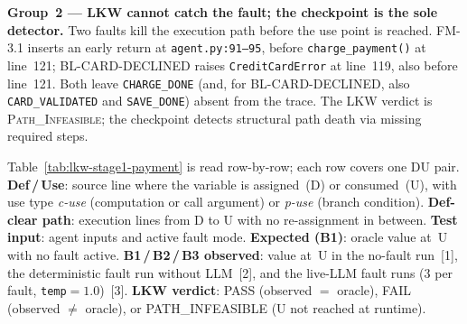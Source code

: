 \documentclass[sigconf,review,anonymous,balance=false]{acmart}
\begin{document}
\textbf{Group~2 --- LKW cannot catch the fault; the checkpoint is the sole detector.}
Two faults kill the execution path before the use point is reached.
FM-3.1 inserts an early return at \texttt{agent.py:91--95}, before
\texttt{charge\_payment()} at line~121; BL-CARD-DECLINED raises
\texttt{CreditCardError} at line~119, also before line~121.
Both leave \texttt{CHARGE\_DONE} (and, for BL-CARD-DECLINED, also
\texttt{CARD\_VALIDATED} and \texttt{SAVE\_DONE}) absent from the trace.
The LKW verdict is \textsc{Path\_Infeasible}; the checkpoint detects structural
path death via missing required steps.

Table~\ref{tab:lkw-stage1-payment} is read row-by-row; each row covers one DU pair.
\textbf{Def\,/\,Use}: source line where the variable is assigned~(D) or
consumed~(U), with use type \emph{c-use} (computation or call argument) or
\emph{p-use} (branch condition).
\textbf{Def-clear path}: execution lines from D to U with no re-assignment in between.
\textbf{Test input}: agent inputs and active fault mode.
\textbf{Expected (B1)}: oracle value at~U with no fault active.
\textbf{B1\,/\,B2\,/\,B3 observed}: value at~U in the no-fault run~[1], the
deterministic fault run without LLM~[2], and the live-LLM fault runs
(3 per fault, \texttt{temp}$=1.0$)~[3].
\textbf{LKW verdict}: PASS (observed $=$ oracle), FAIL (observed $\neq$ oracle),
or PATH\_INFEASIBLE (U not reached at runtime).
\end{document}
